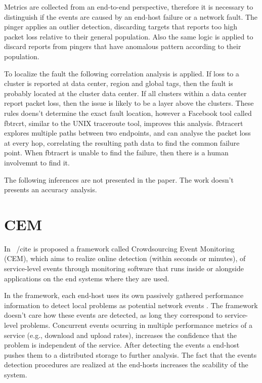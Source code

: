 Metrics are collected from an end-to-end perspective, therefore it
is necessary to distinguish if the events are caused by an end-host failure or
a network fault. The pinger applies an outlier detection,
discarding targets that reports too high packet loss relative to their general
population. Also the same logic is applied to discard reports from pingers that
have anomalous pattern according to their population.

To localize the fault the following
correlation analysis is applied. If loss to a cluster is reported at data center,
region and global tags, then the fault is probably located at the cluster data center.
If all clusters within a data center report packet loss, then the issue is
likely to be a layer above the clusters. These rules doens't determine the
exact fault location, however a Facebook tool called fbtrcrt, similar to the
UNIX traceroute tool, improves this analysis. fbtracert explores multiple
paths between two endpoints, and can analyse the
packet loss at every hop, correlating the resulting path data to find the
common failure point. When fbtracrt is unable to find the failure, then there
is a human involvemnt to find it.

The following inferences are not presented in the paper. The work doesn't
presents an accuracy analysis.

\section{CEM}

In ~/cite{} is proposed a
framework called Crowdsourcing Event Monitoring (CEM), which aims to realize
online detection (within seconds or minutes), of service-level events through
monitoring software that runs inside or alongside applications on the end
systems where they are used.

In the framework, each end-host uses its own passively gathered
performance information to detect local problems as potential network events
. The framework doesn't care how these events are detected,
as long they
correspond to service-level problems. Concurrent events ocurring in multiple
performance metrics of a service (e.g., download and upload rates), increases the
confidence that the problem is independent of the service. After detecting the
events a end-host pushes them to a distributed storage to further analysis. The
fact that the events detection procedures are realized at the end-hosts
increases the scability of the system.

